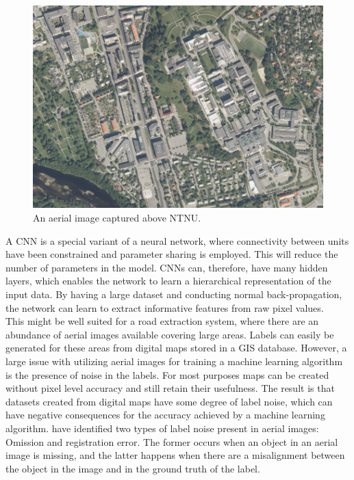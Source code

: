 \begin{figure}[t]
\begin{center}
\includegraphics[width=0.8\columnwidth]{figs/aerial_image.png}
\caption[Aerial image]{An aerial image captured above NTNU.}
\label{fig:aerialimage}
\end{center}
\end{figure}

A \ac{CNN} is a special variant of a neural network, where connectivity between units have been constrained and parameter sharing is employed. This will reduce the number of parameters in the model. \ac{CNN}s can, therefore, have many hidden layers, which enables the network to learn a hierarchical representation of the input data. By having a large dataset and conducting normal back-propagation, the network can learn to extract informative features from raw pixel values. \\

This might be well suited for a road extraction system, where there are an abundance of aerial images available covering large areas. Labels can easily be generated for these areas from digital maps stored in a \ac{GIS} database. However, a large issue with utilizing aerial images for training a machine learning algorithm is the presence of noise in the labels. For most purposes maps can be created without pixel level accuracy and still retain their usefulness. The result is that datasets created from digital maps have some degree of label noise, which can have negative consequences for the accuracy achieved by a machine learning algorithm. \cite{Mnih_aerial_images_noisy} have identified two types of label noise present in aerial images: Omission and registration error. The former occurs when an object in an aerial image is missing, and the latter happens when there are a misalignment between the object in the image and in the ground truth of the label.\\

